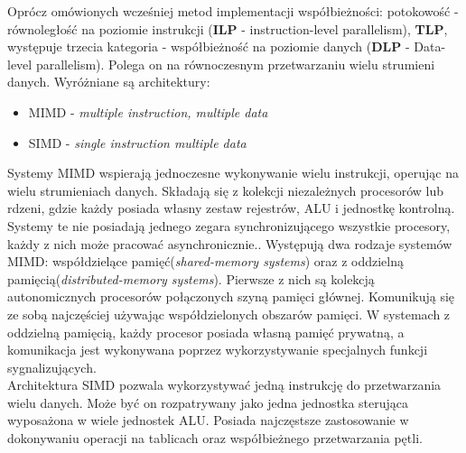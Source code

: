 \documentclass[document.tex]{subfiles}
\begin{document}
\indent Oprócz omówionych wcześniej metod implementacji współbieżności: potokowość - równoległość na poziomie instrukcji
(\textbf{ILP} - instruction-level parallelism), \textbf{TLP},
występuje trzecia kategoria - współbieżność na poziomie danych
(\textbf{DLP} - Data-level parallelism). Polega on na równoczesnym przetwarzaniu wielu strumieni danych.
Wyróżniane są architektury:
\begin{itemize}
\item MIMD - \textit{multiple instruction, multiple data} 
\item SIMD - \textit{single instruction multiple data}
\end{itemize}
\indent Systemy MIMD wspierają jednoczesne wykonywanie wielu instrukcji, operując na wielu strumieniach danych. Składają się z kolekcji niezależnych procesorów lub rdzeni, gdzie każdy posiada własny zestaw rejestrów, ALU i jednostkę kontrolną. Systemy te nie posiadają jednego zegara synchronizującego wszystkie procesory, każdy z nich może pracować asynchronicznie.\cite{openmp_pacheco}\cite{OS_Stallings}.
Występują dwa rodzaje systemów MIMD: współdzielące pamięć(\textit{shared-memory systems}) oraz
z oddzielną pamięcią(\textit{distributed-memory systems}).
Pierwsze z nich są kolekcją autonomicznych procesorów połączonych szyną pamięci głównej. Komunikują się ze sobą najczęściej używając współdzielonych obszarów pamięci.
W systemach z oddzielną pamięcią, każdy procesor posiada własną
pamięć prywatną, a komunikacja jest wykonywana poprzez wykorzystywanie specjalnych funkcji sygnalizujących.\cite{OS_Stallings}
\\
\indent Architektura SIMD pozwala wykorzystywać jedną instrukcję do przetwarzania wielu danych. Może być on rozpatrywany
jako jedna jednostka sterująca wyposażona w wiele jednostek ALU.
Posiada najczęstsze zastosowanie w dokonywaniu operacji na tablicach oraz współbieżnego przetwarzania pętli. 
\cite{Computer_Architecture_Patterson_Hennesy}\cite{openmp_pacheco}

\clearpage
\end{document}
